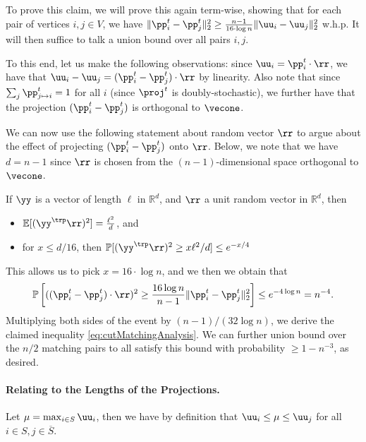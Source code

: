 To prove this claim, we will prove this again term-wise, showing that for each pair of vertices $i,j \in V$, we have $\|\pp_{i}^t - \pp_{j}^t \|_2^2 \geq \frac{n-1}{16 \cdot \log n} \|\uu_i - \uu_j\|^2_2$ w.h.p. It will then suffice to talk a union bound over all pairs $i,j$. 

To this end, let us make the following observations: since $\uu_i = \pp_i^t \cdot \rr$, we have that $\uu_i - \uu_j = (\pp_i^t - \pp_j^t) \cdot \rr$ by linearity. Also note that since $\sum_j \pp_{j \mapsto i}^t = 1$ for all $i$ (since $\proj^t$ is doubly-stochastic), we further have that the projection $(\pp_i^t - \pp_j^t)$ is orthogonal to $\vecone$.

We can now use the following statement about random vector $\rr$ to argue about the effect of projecting $(\pp_i^t - \pp_j^t)$ onto $\rr$. Below, we note that we have $d = n-1$ since $\rr$ is chosen from the $(n-1)$-dimensional space orthogonal to $\vecone$.

\begin{theorem}\label{thm:factsGaussianAnnulus}
If $\yy$ is a vector of length $\ell$ in $\mathbb{R}^d$, and $\rr$ a unit random vector in $\mathbb{R}^d$, then
\begin{itemize}
    \item $\mathbb{E}[(\yy^\trp \rr)^2] = \frac{\ell^2}{d}$, and
    \item for $x \leq d/16$, then $\mathbb{P}[(\yy^\trp \rr)^2 \geq x\ell^2/d] \leq e^{-x/4}$
\end{itemize}
\end{theorem}

This allows us to pick $x = 16 \cdot \log n$, and we then we obtain that
\[
    \mathbb{P}\left[ ((\pp_i^t - \pp_j^t) \cdot \rr)^2 \geq  \frac{16 \log n}{n-1} \|\pp_i^t - \pp_j^t\|_2^2\right] \leq e^{-4 \log n} = n^{-4}.
\]
Multiplying both sides of the event by $(n-1)/(32 \log n)$, we derive the claimed inequality  \ref{eq:cutMatchingAnalysis}. We can further union bound over the $n/2$ matching pairs to all satisfy this bound with probability $\geq 1-n^{-3}$, as desired.

\paragraph{Relating to the Lengths of the Projections.} Let $\mu = \max_{i \in S} \uu_i$, then we have by definition that $\uu_i \leq \mu \leq \uu_j$ for all $i \in S, j \in \overline{S}$.

